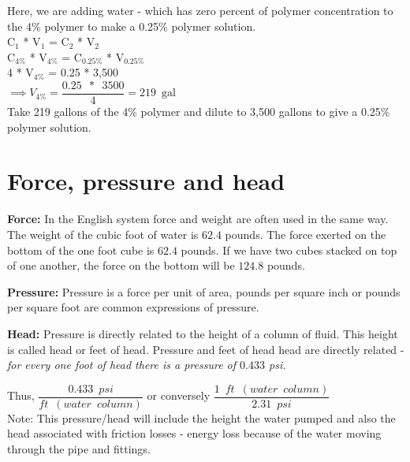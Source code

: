\begin{enumerate}[1.]
\vspace{0.3cm}
Here, we are adding water - which has zero percent of polymer concentration to the 4\% polymer to make a 0.25\% polymer solution.\\
\vspace{0.3cm}
C$_1$ * V$_1$ = C$_2$ * V$_2$\\
\vspace{0.3cm}
C$_{4\%}$ * V$_{4\%}$ =  C$_{0.25\%}$ * V$_{0.25\%}$\\
\vspace{0.3cm}
4 * V$_{4\%}$ =  0.25 * 3,500\\
\vspace{0.3cm}
$\implies V_{4\%} = \dfrac{0.25 \enspace * \enspace 3500}{4}= \boxed{219 \enspace\textrm{gal}} $\\
\vspace{0.3cm}
Take 219 gallons of the 4\% polymer and dilute to 3,500 gallons to give a 0.25\% polymer solution.\\

\end{enumerate}





\section{Force, pressure and head} 

\textbf{Force:}  In the English system force and weight are often used in the same way. The weight of the cubic foot of water is $62.4$ pounds. The force exerted on the bottom of the one foot cube is $62.4$ pounds. If we have two cubes stacked on top of one another, the force on the bottom will be $124.8$ pounds.

\textbf{Pressure:} Pressure is a force per unit of area, pounds per square inch or pounds per square foot are common expressions of pressure. 

\textbf{Head:}  Pressure is directly related to the height of a column of fluid. This height is called head or feet of head. Pressure and feet of head head are directly related - \emph{for every one foot of head there is a pressure of $0.433$ psi.}

\vspace{0.2cm}
Thus, $\dfrac{0.433 \enspace psi}{ft \enspace (water \enspace column)}$ or conversely $\dfrac{1 \enspace ft \enspace (water \enspace column)}{2.31 \enspace psi}$\\
\vspace{0.2cm}
Note:  This pressure/head will include the height the water pumped and also the head associated with friction losses - energy loss because of the water moving through the pipe and fittings.\\


